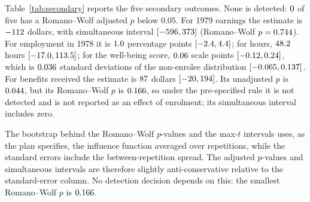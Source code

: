 \documentclass[11pt]{article}
\newcommand{\ci}[2]{$[#1, #2]$}
\begin{document}
Table~\ref{tab:secondary} reports the five secondary outcomes. None is detected:
$0$ of five has a Romano--Wolf adjusted $p$ below 0.05. For 1979 earnings the
estimate is $-112$ dollars, with simultaneous interval
\ci{\SecEarnNextMaxTLow}{\SecEarnNextMaxTHigh} (Romano--Wolf $p = 0.744$). For
employment in 1978 it is $1.0$ percentage points
\ci{\SecEmployedMaxTLow}{\SecEmployedMaxTHigh}; for hours, $48.2$ hours
\ci{\SecHoursMaxTLow}{\SecHoursMaxTHigh}; for the well-being score, $0.06$
scale points \ci{\SecWellbeingMaxTLow}{\SecWellbeingMaxTHigh}, which is $0.036$
standard deviations of the non-enrolee distribution
\ci{\SecWellbeingMaxTLowSD}{\SecWellbeingMaxTHighSD}. For benefits received the estimate is
$87$ dollars \ci{\SecBenefitsMaxTLow}{\SecBenefitsMaxTHigh}. Its unadjusted
$p$ is $0.044$, but its Romano--Wolf $p$ is $0.166$, so under the
pre-specified rule it is not detected and is not reported as an effect of enrolment; its
simultaneous interval includes zero.

The bootstrap behind the Romano--Wolf $p$-values and the max-$t$ intervals uses, as the plan
specifies, the influence function averaged over repetitions, while the standard errors
include the between-repetition spread. The adjusted $p$-values and simultaneous intervals are
therefore slightly anti-conservative relative to the standard-error column. No detection
decision depends on this: the smallest Romano--Wolf $p$ is $0.166$.

\begin{table}[tbp]
\centering
\caption{Secondary outcome family (H2). Each outcome is estimated with the primary estimator
on the same folds and propensity fits, with $n = \PrimaryN$ and no missing or inadmissible
values. Romano--Wolf step-down $p$-values and single-step max-$t$ simultaneous 95\% intervals
come from one Gaussian multiplier bootstrap on the influence functions, with the nuisance
models not re-fitted. An outcome counts as ``detected'' if and only if its Romano--Wolf
$p < 0.05$; none is. Unadjusted $p$-values are shown for reference only, and an outcome with
an unadjusted $p$ below 0.05 but a Romano--Wolf $p$ above it (benefits78) is not described as
affected. Per-outcome unadjusted intervals are not reported. The bootstrap uses the influence
function averaged over repetitions, so its scale omits the between-repetition variance in the
standard errors; the Romano--Wolf $p$-values and max-$t$ intervals are slightly
anti-conservative relative to the SE column. $^{a}$~An integer scale assumed to be
$[0, 10]$; the brief documents no scale. $^{b}$~In units of the SD of wellbeing78 among
non-enrolees ($\SecWellbeingControlSD$ scale points).}
\label{tab:secondary}
\footnotesize
\setlength{\tabcolsep}{4pt}
\resizebox{\textwidth}{!}{}
\end{table}
\end{document}
